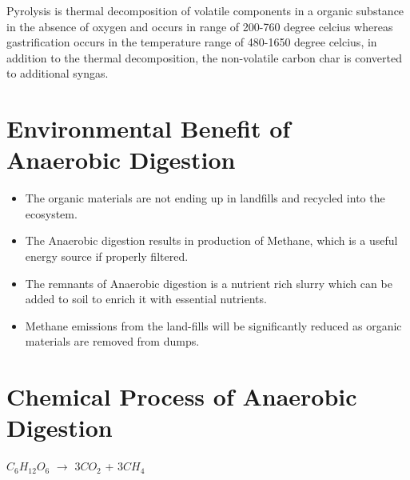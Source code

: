 \documentclass[12pt,a4paper]{article}
\begin{document}
Pyrolysis is thermal decomposition of volatile components in a organic substance in the absence of oxygen and occurs in range of 200-760 degree celcius whereas gastrification occurs in the temperature range of 480-1650 degree celcius, in addition to the thermal decomposition, the non-volatile carbon char is converted to additional syngas. 

\section{Environmental Benefit of Anaerobic Digestion}
\begin{itemize}
        \item The organic materials are not ending up in landfills and recycled into the ecosystem.
        \item The Anaerobic digestion results in production of Methane, which is a useful energy source if properly filtered.
        \item The remnants of Anaerobic digestion is a nutrient rich slurry which can be added to soil to enrich it with essential nutrients.
        \item Methane emissions from the land-fills will be significantly reduced as organic materials are removed from dumps. 

\end{itemize} 

\section{Chemical Process of Anaerobic Digestion}

$C_{6}H_{12}O_{6}$ $\rightarrow$ $3CO_{2}$ + $3CH_{4}$

\newpage

\printbibliography[heading=bibliography,title={References}]
\end{document}
